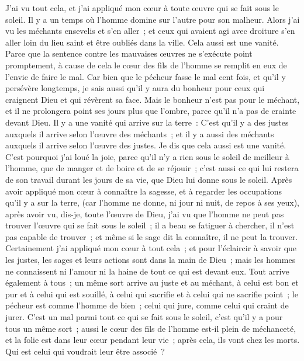 \begin{multicols}{2}
J'ai vu tout cela, et j'ai appliqué mon cœur à toute œuvre qui se fait sous le soleil. Il y a un temps où l'homme domine sur l'autre pour son malheur.
Alors j'ai vu les méchants ensevelis et s'en aller~; et ceux qui avaient agi avec droiture s'en aller loin du lieu saint et être oubliés dans la ville. Cela aussi est une vanité.
Parce que la sentence contre les mauvaises œuvres ne s'exécute point promptement, à cause de cela le cœur des fils de l'homme se remplit en eux de l'envie de faire le mal.
Car bien que le pécheur fasse le mal cent fois, et qu'il y persévère longtemps, je sais aussi qu'il y aura du bonheur pour ceux qui craignent Dieu et qui révèrent sa face.
Mais le bonheur n'est pas pour le méchant, et il ne prolongera point ses jours plus que l'ombre, parce qu'il n'a pas de crainte devant Dieu.
Il y a une vanité qui arrive sur la terre~: C'est qu'il y a des justes auxquels il arrive selon l'œuvre des méchants~; et il y a aussi des méchants auxquels il arrive selon l'œuvre des justes. Je dis que cela aussi est une vanité.
C'est pourquoi j'ai loué la joie, parce qu'il n'y a rien sous le soleil de meilleur à l'homme, que de manger et de boire et de se réjouir~; c'est aussi ce qui lui restera de son travail durant les jours de sa vie, que Dieu lui donne sous le soleil.
Après avoir appliqué mon cœur à connaître la sagesse, et à regarder les occupations qu'il y a sur la terre, (car l'homme ne donne, ni jour ni nuit, de repos à ses yeux),
après avoir vu, dis-je, toute l'œuvre de Dieu, j'ai vu que l'homme ne peut pas trouver l'œuvre qui se fait sous le soleil~; il a beau se fatiguer à chercher, il n'est pas capable de trouver~; et même si le sage dit la connaître, il ne peut la trouver.
\VerseOne{}Certainement j'ai appliqué mon cœur à tout cela~; et pour l'éclaircir à savoir que les justes, les sages et leurs actions sont dans la main de Dieu~; mais les hommes ne connaissent ni l'amour ni la haine de tout ce qui est devant eux.
Tout arrive également à tous~; un même sort arrive au juste et au méchant, à celui est bon et pur et à celui qui est souillé, à celui qui sacrifie et à celui qui ne sacrifie point~; le pécheur est comme l'homme de bien~; celui qui jure, comme celui qui craint de jurer.
C'est un mal parmi tout ce qui se fait sous le soleil, c'est qu'il y a pour tous un même sort~; aussi le cœur des fils de l'homme est-il plein de méchanceté, et la folie est dans leur cœur pendant leur vie~; après cela, ils vont chez les morts. Qui est celui qui voudrait leur être associé~?

\end{multicols}
